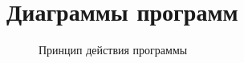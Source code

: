 \chapter[ПРИЛОЖЕНИЕ А Диаграммы программ]{Диаграммы программ}
%
\begin{figure}[hp]
\begin{small}

\end{small}
\caption{Принцип действия программы}
\end{figure}

